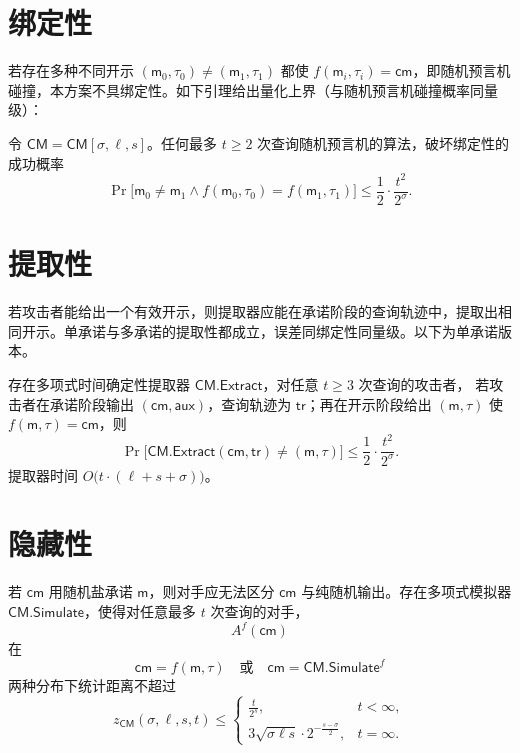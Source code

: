 \documentclass[american,singlepageview]{snargs-book-zh}
\newcommand{\AuxiliaryState}{\mathsf{aux}}
\newcommand{\ProtoAdversary}{A}
\newcommand{\ProtoSalt}{\tau}
\newcommand{\ROFunction}{f}
\newcommand{\ROQueryBound}{t}
\newcommand{\ROTrace}{\mathsf{tr}}
\newcommand{\ROAdvState}{\AuxiliaryState}
\newcommand{\ROOutputSize}{\sigma}
\newcommand{\CMSymbol}{\mathsf{CM}}
\newcommand{\CMSubscript}{\scriptscriptstyle\CMSymbol}
\newcommand{\CMConstructor}[3]{\CMSymbol[#1,#2,#3]}
\newcommand{\CMExtractor}{\CMSymbol.\mathsf{Extract}}
\newcommand{\CMSimulator}{\CMSymbol.\mathsf{Simulate}}
\newcommand{\CMMessageLength}{\ell}
\newcommand{\CMSaltSize}{s}
\newcommand{\CMCommitment}{\mathsf{cm}}
\newcommand{\CMMessage}{\mathsf{m}}
\newcommand{\CMSaltString}{\ProtoSalt}
\newcommand{\CMHidingError}{z_{\CMSubscript}}
\newcommand{\CMAdversary}{\ProtoAdversary}
\newcommand{\CMBindingExpression}[2]{\frac{1}{2} \cdot \frac{#2^2}{2^{#1}}}
\newcommand{\CMExtractabilityExpression}[2]{\CMBindingExpression{#1}{#2}}
\newcommand{\CMHidingExpressionFinite}[2]{\frac{#2}{2^{#1}}}
\newcommand{\CMHidingExpressionInfinite}[1]{3 \sqrt{\ROOutputSize \CMMessageLength #1} \cdot 2^{-\frac{#1 - \ROOutputSize}{2}}}
\begin{document}
\section{绑定性}
\label{section:basic-commitment-binding}

若存在多种不同开示 $(\CMMessage_0,\CMSaltString_0)\neq(\CMMessage_1,\CMSaltString_1)$ 都使 $\ROFunction(\CMMessage_i,\CMSaltString_i)=\CMCommitment$，即随机预言机碰撞，本方案不具绑定性。如下引理给出量化上界（与随机预言机碰撞概率同量级）：
\begin{lemma}[$\CMSymbol$ 的绑定性]
\label{lemma:cm-binding}
令 $\CMSymbol=\CMConstructor{\ROOutputSize}{\CMMessageLength}{\CMSaltSize}$。任何最多 $\ROQueryBound\ge2$ 次查询随机预言机的算法，破坏绑定性的成功概率
\[
\Pr\bigl[\CMMessage_0\neq\CMMessage_1\land
\ROFunction(\CMMessage_0,\CMSaltString_0)=\ROFunction(\CMMessage_1,\CMSaltString_1)\bigr]
\le
\CMBindingExpression{\ROOutputSize}{\ROQueryBound}.
\]
\end{lemma}

\section{提取性}
\label{section:basic-commitment-extractability}

若攻击者能给出一个有效开示，则提取器应能在承诺阶段的查询轨迹中，提取出相同开示。单承诺与多承诺的提取性都成立，误差同绑定性同量级。以下为单承诺版本。

\begin{lemma}[$\CMSymbol$ 可提取]
\label{lemma:cm-extractability}
存在多项式时间确定性提取器 $\CMExtractor$，对任意 $\ROQueryBound\ge3$ 次查询的攻击者，
若攻击者在承诺阶段输出 $(\CMCommitment,\ROAdvState)$，查询轨迹为 $\ROTrace$；再在开示阶段给出 $(\CMMessage,\CMSaltString)$ 使 $\ROFunction(\CMMessage,\CMSaltString)=\CMCommitment$，则
\[
\Pr\bigl[\CMExtractor(\CMCommitment,\ROTrace)\neq(\CMMessage,\CMSaltString)\bigr]
\le \CMExtractabilityExpression{\ROOutputSize}{\ROQueryBound}.
\]
提取器时间 $O\bigl(\ROQueryBound\cdot(\CMMessageLength+\CMSaltSize+\ROOutputSize)\bigr)$。
\end{lemma}

\section{隐藏性}
\label{section:basic-commitment-hiding}

若 $\CMCommitment$ 用随机盐承诺 $\CMMessage$，则对手应无法区分 $\CMCommitment$ 与纯随机输出。存在多项式模拟器 $\CMSimulator$，使得对任意最多 $\ROQueryBound$ 次查询的对手，
\[
\CMAdversary^{\ROFunction}(\CMCommitment)
\]
在
\[
\CMCommitment=\ROFunction(\CMMessage,\CMSaltString)\quad\text{或}\quad
\CMCommitment=\CMSimulator^{\ROFunction}
\]
两种分布下统计距离不超过
\[
\CMHidingError(\ROOutputSize,\CMMessageLength,\CMSaltSize,\ROQueryBound)
\le
\begin{cases}
\CMHidingExpressionFinite{\CMSaltSize}{\ROQueryBound},&\ROQueryBound<\infty,\\
\CMHidingExpressionInfinite{\CMSaltSize},&\ROQueryBound=\infty.
\end{cases}
\]
\end{document}
